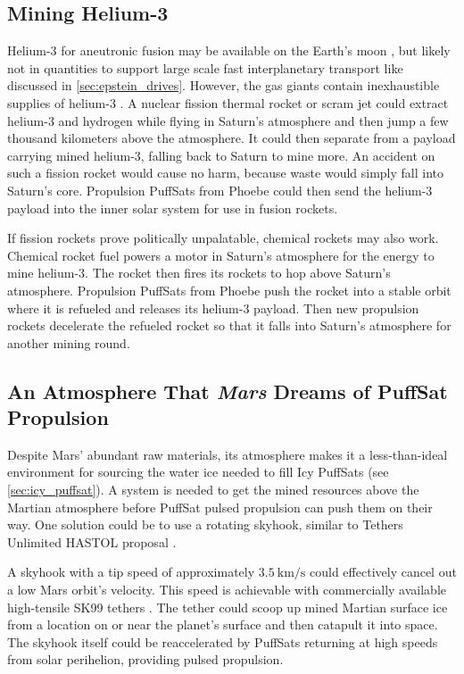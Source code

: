 \documentclass{article}
\begin{document}
\subsection{Mining Helium-3} \label{sec:mining_helium_3}
Helium-3 for aneutronic fusion may be available on the Earth's moon \cite{esa_helium3_mining}, but likely not in quantities to support large scale fast interplanetary transport like discussed in \autoref{sec:epstein_drives}.   However, the gas giants contain inexhaustible supplies of helium-3 \cite{palaszewski2005atmospheric}.   A nuclear fission thermal rocket or scram jet could extract helium-3 and hydrogen while flying in Saturn's atmosphere and then jump a few thousand kilometers above the atmosphere.  It could then separate from a payload carrying mined helium-3, falling back to Saturn to mine more.  An accident on such a fission rocket would cause no harm, because waste would simply fall into Saturn's core. Propulsion PuffSats from Phoebe could then send the helium-3 payload into the inner solar system for use in fusion rockets.  

If fission rockets prove politically unpalatable, chemical rockets may also work.   Chemical rocket fuel powers a motor in Saturn's atmosphere for the energy to mine helium-3.  The rocket then fires its rockets to hop above Saturn's atmosphere.   Propulsion PuffSats from Phoebe push the rocket into a stable orbit where it is refueled and releases its helium-3 payload.  Then new propulsion rockets decelerate the refueled rocket so that it falls into Saturn's atmosphere for another mining round.

\subsection{An Atmosphere That \textit{Mars} Dreams of PuffSat Propulsion}
Despite Mars' abundant raw materials, its atmosphere makes it a less-than-ideal environment for sourcing the water ice needed to fill Icy PuffSats (see \autoref{sec:icy_puffsat}). A system is needed to get the mined resources above the Martian atmosphere before PuffSat pulsed propulsion can push them on their way. One solution could be to use a rotating skyhook, similar to Tethers Unlimited HASTOL proposal \cite{skyhook_hastol}.

A skyhook with a tip speed of approximately $\SI{3.5}{\kilo\meter\per\second}$ could effectively cancel out a low Mars orbit's velocity. This speed is achievable with commercially available high-tensile SK99 tethers \cite{sk99_tension}. The tether could scoop up mined Martian surface ice from a location on or near the planet's surface and then catapult it into space. The skyhook itself could be reaccelerated by PuffSats returning at high speeds from solar perihelion, providing pulsed propulsion.
\end{document}
